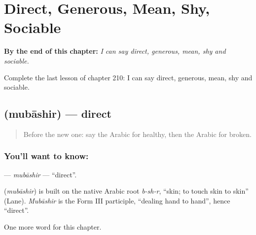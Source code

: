 
\chapter{Direct, Generous, Mean, Shy, Sociable}
\label{ch:ar-direct-generous-mean-shy-sociable}

\begin{chapteropening}
\textbf{By the end of this chapter:} \emph{I can say direct, generous, mean, shy and sociable.}

Complete the last lesson of chapter 210: I can say direct, generous, mean, shy and sociable.
\end{chapteropening}

\section[\texorpdfstring{\ar{مباشر} (mubāshir)}{مباشر (mubāshir)}]{ (mubāshir) — direct}

\label{lesson:AR-C210-mubashir}



\begin{quote}
Before the new one: say the Arabic for healthy, then the Arabic for broken.
\end{quote}

\subsection*{You'll want to know: }
\textbf{} — \emph{mubāshir} — \textquotedblleft{}direct\textquotedblright{}.

\begin{cousinweb}
\textbf{} (\emph{mubāshir}) is built on the native Arabic root \emph{b-sh-r}, \textquotedblleft{}skin; to touch skin to skin\textquotedblright{} (Lane). \emph{Mubāshir} is the Form III participle, \textquotedblleft{}dealing hand to hand\textquotedblright{}, hence \textquotedblleft{}direct\textquotedblright{}.
\end{cousinweb}

\begin{grammarlens}[title={What you've built}]
One more word for this chapter.
\end{grammarlens}

